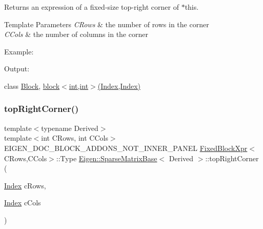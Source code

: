 \begin{DoxyReturn}{Returns}
an expression of a fixed-\/size top-\/right corner of $\ast$this.
\end{DoxyReturn}

\begin{DoxyTemplParams}{Template Parameters}
{\em C\+Rows} & the number of rows in the corner \\
\hline
{\em C\+Cols} & the number of columns in the corner\\
\hline
\end{DoxyTemplParams}
Example\+: 
\begin{DoxyCodeInclude}{0}
\end{DoxyCodeInclude}
 Output\+: 
\begin{DoxyVerbInclude}
\end{DoxyVerbInclude}
 class \mbox{\hyperlink{class_eigen_1_1_block}{Block}}, \mbox{\hyperlink{class_eigen_1_1_sparse_matrix_base_ad7a342adc59c2866c323ace6d2f65378}{block$<$int,int$>$(\+Index,\+Index)}} \mbox{\label{class_eigen_1_1_sparse_matrix_base_a9db4c184e2222d0c9a945a191251d710}} 
\subsubsection{\texorpdfstring{topRightCorner()}{topRightCorner()}\hspace{0.1cm}{\footnotesize\ttfamily [3/3]}}
{\footnotesize\ttfamily template$<$typename Derived$>$ \\
template$<$int C\+Rows, int C\+Cols$>$ \\
E\+I\+G\+E\+N\+\_\+\+D\+O\+C\+\_\+\+B\+L\+O\+C\+K\+\_\+\+A\+D\+D\+O\+N\+S\+\_\+\+N\+O\+T\+\_\+\+I\+N\+N\+E\+R\+\_\+\+P\+A\+N\+EL \mbox{\hyperlink{struct_eigen_1_1_sparse_matrix_base_1_1_fixed_block_xpr}{Fixed\+Block\+Xpr}}$<$C\+Rows,C\+Cols$>$\+::Type \mbox{\hyperlink{class_eigen_1_1_sparse_matrix_base}{Eigen\+::\+Sparse\+Matrix\+Base}}$<$ Derived $>$\+::top\+Right\+Corner (\begin{DoxyParamCaption}\item[{\mbox{\hyperlink{struct_eigen_1_1_eigen_base_a554f30542cc2316add4b1ea0a492ff02}{Index}}}]{c\+Rows,  }\item[{\mbox{\hyperlink{struct_eigen_1_1_eigen_base_a554f30542cc2316add4b1ea0a492ff02}{Index}}}]{c\+Cols }\end{DoxyParamCaption})\hspace{0.3cm}{\ttfamily [inline]}}

